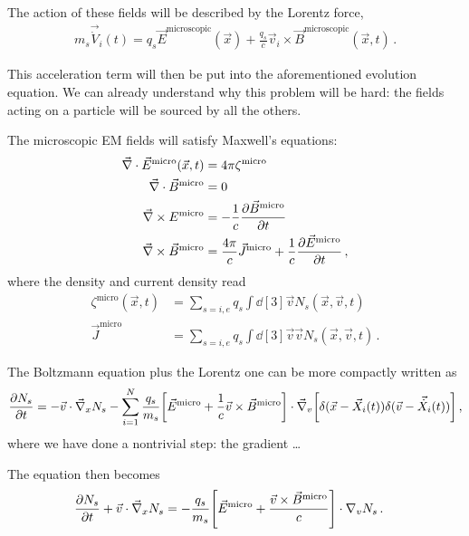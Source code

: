 \documentclass[main.tex]{subfiles}
\begin{document}
The action of these fields will be described by the Lorentz force, 
%
\begin{align}
m_s \vec{\dot{V}}_i (t) = q_s \vec{E}^{\text{microscopic}} (\vec{x}) + \frac{q_s}{c} \vec{v}_i \times \vec{B}^{\text{microscopic}} (\vec{x}, t)
\,.
\end{align}

This acceleration term will then be put into the aforementioned evolution equation. 
We can already understand why this problem will be hard: the fields acting on a particle will be sourced by all the others. 

The microscopic EM fields will satisfy Maxwell's equations: 
%
\begin{align}
\vec{\nabla} \cdot \vec{E}^{\text{micro}} (\vec{x}, t) 
&= 4 \pi \zeta^{\text{micro}}  \\
\vec{\nabla} \cdot \vec{B}^{\text{micro}} &= 0  \\
\vec{\nabla} \times E^{\text{micro}} &= - \frac{1}{c} \pdv{\vec{B}^{\text{micro}}}{t}  \\
\vec{\nabla} \times \vec{B}^{\text{micro}} &= \frac{4 \pi }{c} \vec{J}^{\text{micro}} + \frac{1}{c} \pdv{\vec{E}^{\text{micro}}}{t} 
\,,
\end{align}
%
where the density and current density read 
%
\begin{align}
\zeta^{\text{micro}} (\vec{x}, t) &= \sum _{s=i, e} q_s 
\int \dd[3]{\vec{v}} N_s (\vec{x}, \vec{v}, t)  \\
\vec{J}^{\text{micro}} &= \sum _{s=i, e} q_s 
\int \dd[3]{\vec{v}} \vec{v} N_s (\vec{x}, \vec{v}, t)
\,.
\end{align}

The Boltzmann equation plus the Lorentz one can be more compactly written as 
%
\begin{align}
\pdv{N_s}{t} 
= - \vec{v} \cdot \vec{\nabla}_x N_s 
- \sum _{i=1}^{N} \frac{q_s}{m_s} 
\qty[ \vec{E}^{\text{micro}} + \frac{1}{c} \vec{v} \times \vec{B}^{\text{micro}}] \cdot \vec{\nabla}_v \qty[\delta (\vec{x} - \vec{X}_i(t)) \delta (\vec{v} - \vec{\dot{X}}_i(t))]
\,,
\end{align}
%
where we have done a nontrivial step: the gradient \dots


The equation then becomes 
%
\begin{align}
\pdv{N_s}{t} + \vec{v} \cdot \vec{\nabla}_x N_s 
&= - \frac{q_s}{m_s} \qty[\vec{E}^{\text{micro}} + \frac{\vec{v} \times \vec{B}^{\text{micro}}}{c}] \cdot \nabla_v N_s
\,.
\end{align}
\end{document}
